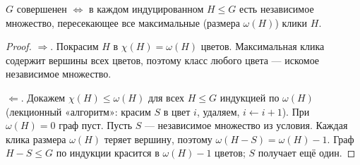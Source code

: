 \begin{lemma}\label{lem:crit}
\(G\) совершенен \(\iff\) в каждом индуцированном \(H\le G\) есть независимое множество,
пересекающее все максимальные (размера \(\omega(H)\)) клики \(H\).
\end{lemma}
\begin{proof}
\(\Rightarrow\). Покрасим \(H\) в \(\chi(H)=\omega(H)\) цветов. Максимальная клика содержит вершины
всех цветов, поэтому класс любого цвета — искомое независимое множество.

\(\Leftarrow\). Докажем \(\chi(H)\le\omega(H)\) для всех \(H\le G\) индукцией по \(\omega(H)\) (лекционный
«алгоритм»: красим \(S\) в цвет \(i\), удаляем, \(i\gets i+1\)). При \(\omega(H)=0\) граф пуст. Пусть
\(S\) — независимое множество из условия. Каждая клика размера \(\omega(H)\) теряет вершину, поэтому
\(\omega(H-S)=\omega(H)-1\). Граф \(H-S\le G\) по индукции красится в \(\omega(H)-1\) цветов; \(S\) получает
ещё один.
\end{proof}

